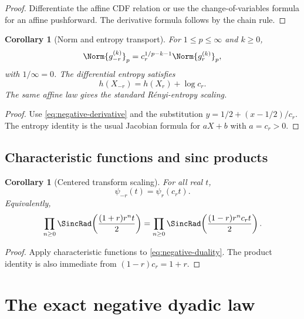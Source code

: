 \documentclass[11pt]{article}
\newtheorem{corollary}[theorem]{Corollary}
\theoremstyle{definition}
\begin{document}
\begin{proof}
Differentiate the affine CDF relation or use the change-of-variables formula for an
affine pushforward.  The derivative formula follows by the chain rule.
\end{proof}

\begin{corollary}[Norm and entropy transport]\label{cor:norm-entropy}
For \(1\le p\le\infty\) and \(k\ge0\),
\begin{equation}
 \Norm{g_{-r}^{(k)}}_p
 =c_r^{1/p-k-1}\Norm{g_r^{(k)}}_p,                        \label{eq:sobolev-scaling}
\end{equation}
with \(1/\infty=0\).  The differential entropy satisfies
\begin{equation}
 h(X_{-r})=h(X_r)+\log c_r.                               \label{eq:entropy-scaling}
\end{equation}
The same affine law gives the standard Rényi-entropy scaling.
\end{corollary}

\begin{proof}
Use \cref{eq:negative-derivative} and the substitution
\(y=1/2+(x-1/2)/c_r\).  The entropy identity is the usual Jacobian formula for
\(aX+b\) with \(a=c_r>0\).
\end{proof}

\subsection{Characteristic functions and sinc products}

\begin{corollary}[Centered transform scaling]\label{cor:negative-char}
For all real \(t\),
\begin{equation}
 \boxed{\psi_{-r}(t)=\psi_r(c_rt).}                       \label{eq:negative-char}
\end{equation}
Equivalently,
\begin{equation}
 \prod_{n\ge0}\SincRad\!\left(\frac{(1+r)r^nt}{2}\right)
 =\prod_{n\ge0}\SincRad\!\left(\frac{(1-r)r^nc_rt}{2}\right).
\end{equation}
\end{corollary}

\begin{proof}
Apply characteristic functions to \cref{eq:negative-duality}.  The product identity is
also immediate from \((1-r)c_r=1+r\).
\end{proof}

\section{The exact negative dyadic law}
\end{document}
